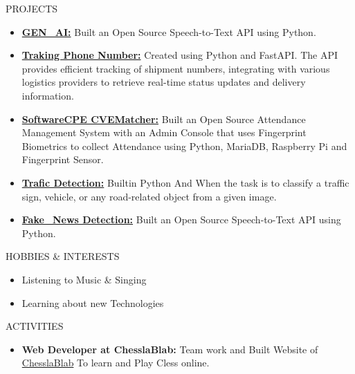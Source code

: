 \documentclass{resume}
\begin{document}
\begin{rSection}{PROJECTS}
    \begin{itemize}
        \item \textbf{\href{https://github.com/trishaamandal/Gen-AI}{GEN\_AI:}} {Built an Open Source Speech-to-Text API using Python.}
        \item \textbf{\href{https://github.com/trishaamandal/tracking_number}{Traking Phone Number:}} {Created using Python and FastAPI. The API provides efficient tracking of shipment numbers, integrating with various logistics providers to retrieve real-time status updates and delivery information.}
        \item \textbf{\href{https://github.com/trishaamandal/SoftwareCPE-CVE}{SoftwareCPE CVEMatcher:}} {Built an Open Source Attendance Management System with an Admin Console that uses Fingerprint Biometrics to collect Attendance using Python, MariaDB, Raspberry Pi and Fingerprint Sensor.}
        \item \textbf{\href{https://github.com/trishaamandal/Trafic_Detection}{Trafic Detection:}} {Builtin Python And When the task is to classify a traffic sign, vehicle, or any road-related object from a given image.}
        \item \textbf{\href{https://github.com/trishaamandal/fakenews_detection}{Fake\_News Detection:}} {Built an Open Source Speech-to-Text API using Python.}

    \end{itemize}
\end{rSection}
\vspace{-0.4em}

\begin{rSection}{HOBBIES \& INTERESTS}
    \begin{itemize}
        \item Listening to Music \& Singing
              \vspace{-0.4em}
        \item Learning about new Technologies
    \end{itemize}
\end{rSection}
\vspace{-0.4em}

\begin{rSection}{ACTIVITIES}
    \begin{itemize}
        \item \textbf{Web Developer at ChesslaBlab:} Team work and Built Website of {\href{https://github.com/chesslablab}{ChesslaBlab}}  To learn and Play Cless online.
    \end{itemize}
\end{rSection}
\end{document}
